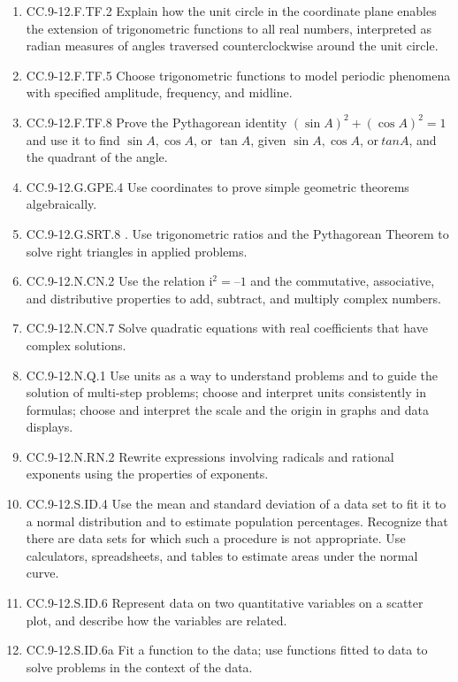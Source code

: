 \begin{enumerate}
	\item CC.9-12.F.TF.2  Explain how the unit circle in the coordinate plane enables the extension of trigonometric functions to all real numbers, interpreted as radian measures of angles traversed counterclockwise around the unit circle.
	\item CC.9-12.F.TF.5  Choose trigonometric functions to model periodic phenomena with specified amplitude, frequency, and midline.
	\item CC.9-12.F.TF.8  Prove the Pythagorean identity $(\sin A)^2 + (\cos A)^2 = 1$ and use it to find $\sin A, \cos A$, or $\tan A$, given $\sin A, \cos A$, or$\ tan A$, and the quadrant of the angle.
	\item CC.9-12.G.GPE.4 Use coordinates to prove simple geometric theorems algebraically. 
	\item CC.9-12.G.SRT.8 . Use trigonometric ratios and the Pythagorean Theorem to solve right triangles in applied problems.
	\item CC.9-12.N.CN.2 Use the relation $\textrm{i}^2 = –1$ and the commutative, associative, and distributive properties to add, subtract, and multiply complex numbers.
	\item CC.9-12.N.CN.7  Solve quadratic equations with real coefficients that have complex solutions.
	\item CC.9-12.N.Q.1  Use units as a way to understand problems and to guide the solution of multi-step problems; choose and interpret units consistently in formulas; choose and interpret the scale and the origin in graphs and data displays.
	\item CC.9-12.N.RN.2  Rewrite expressions involving radicals and rational exponents using the properties of exponents.
	\item CC.9-12.S.ID.4  Use the mean and standard deviation of a data set to fit it to a normal distribution and to estimate population percentages. Recognize that there are data sets for which such a procedure is not appropriate. Use calculators, spreadsheets, and tables to estimate areas under the normal curve.
	\item CC.9-12.S.ID.6  Represent data on two quantitative variables on a scatter plot, and describe how the variables are related.
	\item CC.9-12.S.ID.6a Fit a function to the data; use functions fitted to data to solve problems in the context of the data. 
\end{enumerate}
